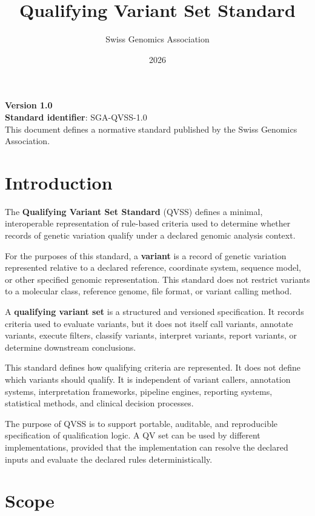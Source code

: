 \documentclass[11pt,a4paper]{article}
\title{\textbf{Qualifying Variant Set Standard}}
\author{Swiss Genomics Association}
\date{2026}
\begin{document}

\maketitle

\noindent
\textbf{Version 1.0}\\
\noindent\textbf{Standard identifier}: SGA-QVSS-1.0\\
\noindent This document defines a normative standard published by the Swiss Genomics Association.

\section{Introduction}

The \textbf{Qualifying Variant Set Standard} (QVSS) defines a minimal, interoperable representation of rule-based criteria used to determine whether records of genetic variation qualify under a declared genomic analysis context.

For the purposes of this standard, a \textbf{variant} is a record of genetic variation represented relative to a declared reference, coordinate system, sequence model, or other specified genomic representation. This standard does not restrict variants to a molecular class, reference genome, file format, or variant calling method.

A \textbf{qualifying variant set} is a structured and versioned specification. It records criteria used to evaluate variants, but it does not itself call variants, annotate variants, execute filters, classify variants, interpret variants, report variants, or determine downstream conclusions.

This standard defines how qualifying criteria are represented. It does not define which variants should qualify. It is independent of variant callers, annotation systems, interpretation frameworks, pipeline engines, reporting systems, statistical methods, and clinical decision processes.

The purpose of QVSS is to support portable, auditable, and reproducible specification of qualification logic. A QV set can be used by different implementations, provided that the implementation can resolve the declared inputs and evaluate the declared rules deterministically.

\section{Scope}
\end{document}
